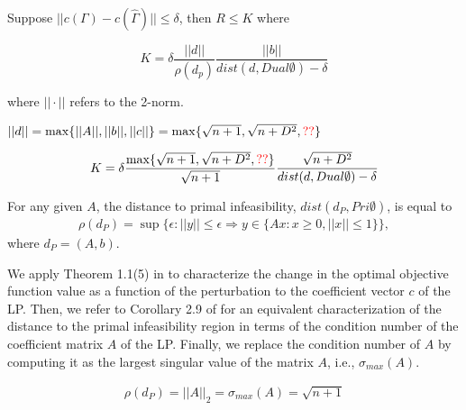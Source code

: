 \documentclass[12pt,a4paper]{article}
\begin{document}
Suppose $||c(\Gamma) - c(\hat{\Gamma})|| \leq \delta$, then $R \leq K $ where

$$ K = \delta \frac{ ||d ||  }{ \rho(d_p)} \frac{||b||}{dist(d, Dual\emptyset)- \delta } $$

where $|| \cdot ||$ refers to the 2-norm.

$||d ||  = \max \{ ||A || , ||b || , ||c ||  \} = \max \{ \sqrt{n+1}, \sqrt{n+D^2}, {\color{red} ??} \} $

$$ K = \delta \frac{ \max \{ \sqrt{n+1}, \sqrt{n+D^2}, {\color{red} ??} \} }{ \sqrt{n+1} } \frac{ \sqrt{n+D^2} }{dist(d, Dual\emptyset)- \delta } $$


\begin{lem}
For any given $A$, the distance to primal infeasibility, $dist(d_P, Pri\emptyset)$, is equal to
\begin{align*}
\rho(d_P) = \sup \{ \epsilon : ||y|| \leq \epsilon \Rightarrow y \in \{ Ax: x \geq 0, ||x|| \leq 1 \}  \},
\end{align*}
where $d_P = (A, b)$.
\end{lem}


We apply Theorem 1.1(5) in \cite{renegar1993some} to characterize the change in the optimal objective function value as a function of the perturbation to the coefficient vector $c$ of the LP. Then, we refer to Corollary 2.9 of \cite{pena2003characterization} for an equivalent characterization of the distance to the primal infeasibility region in terms of the condition number of the coefficient matrix $A$ of the LP. Finally, we replace the condition number of $A$ by computing it as the largest singular value of the matrix $A$, i.e., $\sigma_{max} (A)$. 

\begin{align*}
\rho(d_P) = || A ||_2 = \sigma_{max} (A) = \sqrt{n+1}
\end{align*}



\end{document}
